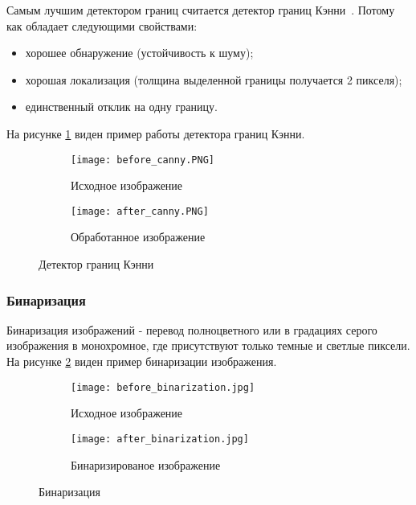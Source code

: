 Самым лучшим детектором границ считается детектор границ Кэнни~\cite{canny_edge_detector}. Потому как обладает следующими свойствами:
\begin{itemize}
  \item хорошее обнаружение (устойчивость к шуму);
  \item хорошая локализация (толщина выделенной границы получается 2 пикселя);
  \item единственный отклик на одну границу.
\end{itemize}

На рисунке \ref{fig:domain:image_processing:edges_detection:canny} виден пример работы детектора границ Кэнни. 

\begin{figure}[ht]
\centering
  \begin{subfigure}[b]{0.48\textwidth} 
    \centering
    \texttt{[image: before\_canny.PNG]}  
    \caption{Исходное изображение}
  \end{subfigure}
  \begin{subfigure}[b]{0.48\textwidth} 
    \centering
    \texttt{[image: after\_canny.PNG]}  
    \caption{Обработанное изображение}
  \end{subfigure}
  \caption{Детектор границ Кэнни}
  \label{fig:domain:image_processing:edges_detection:canny}
\end{figure}


\subsubsection{Бинаризация}
\label{sub:temp:image_processing:binary}

Бинаризация изображений - перевод полноцветного или в градациях серого изображения в монохромное, где присутствуют только темные и светлые пиксели\cite{binary_image}. На рисунке \ref{fig:domain:image_processing:binary:binarization} виден пример бинаризации изображения.

\begin{figure}[ht]
\centering
  \begin{subfigure}[b]{0.48\textwidth} 
    \centering
    \texttt{[image: before\_binarization.jpg]}  
    \caption{Исходное изображение}
  \end{subfigure}
  \begin{subfigure}[b]{0.48\textwidth} 
    \centering
    \texttt{[image: after\_binarization.jpg]}  
    \caption{Бинаризированое изображение}
  \end{subfigure}
  \caption{Бинаризация}
  \label{fig:domain:image_processing:binary:binarization}
\end{figure}

